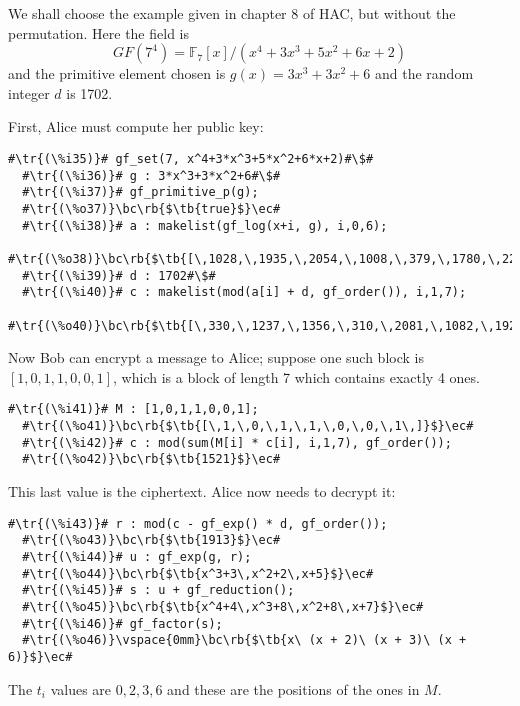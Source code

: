 \documentclass[a4paper,11pt,leqno,fleqn]{artikel3}
\newcommand{\bc}{\begin{center}}
\newcommand{\ec}{\end{center}}
\newcommand{\tr}[1]{\textcolor{red}{#1}}
\newcommand{\tb}[1]{\textcolor{blue}{#1}}
\newcommand{\rb}[1]{\raisebox{2mm}[0mm][1mm]{#1}}
\begin{document}
We shall choose the example given in chapter 8 of HAC, but without the
permutation.  Here the field is
\[
GF(7^4)=\mathbb{F}_7[x]/(x^4+3x^3+5x^2+6x+2)
\]
and the primitive element chosen is $g(x)=3x^3+3x^2+6$ and the random integer
$d$ is 1702.

First, Alice must compute her public key:


\vspace*{2mm}
\begin{lstlisting}[escapechar=\#]
  #\tr{(\%i35)}# gf_set(7, x^4+3*x^3+5*x^2+6*x+2)#\$#
  #\tr{(\%i36)}# g : 3*x^3+3*x^2+6#\$#
  #\tr{(\%i37)}# gf_primitive_p(g);
  #\tr{(\%o37)}\bc\rb{$\tb{true}$}\ec#
  #\tr{(\%i38)}# a : makelist(gf_log(x+i, g), i,0,6);
  #\tr{(\%o38)}\bc\rb{$\tb{[\,1028,\,1935,\,2054,\,1008,\,379,\,1780,\,223\,]}$}\ec#
  #\tr{(\%i39)}# d : 1702#\$#
  #\tr{(\%i40)}# c : makelist(mod(a[i] + d, gf_order()), i,1,7);
  #\tr{(\%o40)}\bc\rb{$\tb{[\,330,\,1237,\,1356,\,310,\,2081,\,1082,\,1925\,]}$}\ec#
\end{lstlisting}

Now Bob can encrypt a message to Alice; suppose one such block is
$[1,0,1,1,0,0,1]$, which is a block of length 7 which contains exactly 4 ones.

\vspace*{2mm}
\begin{lstlisting}[escapechar=\#]
  #\tr{(\%i41)}# M : [1,0,1,1,0,0,1];
  #\tr{(\%o41)}\bc\rb{$\tb{[\,1,\,0,\,1,\,1,\,0,\,0,\,1\,]}$}\ec#
  #\tr{(\%i42)}# c : mod(sum(M[i] * c[i], i,1,7), gf_order());
  #\tr{(\%o42)}\bc\rb{$\tb{1521}$}\ec#
\end{lstlisting}

This last value is the ciphertext.  Alice now needs to decrypt it:

\vspace*{2mm}
\begin{lstlisting}[escapechar=\#]
  #\tr{(\%i43)}# r : mod(c - gf_exp() * d, gf_order());
  #\tr{(\%o43)}\bc\rb{$\tb{1913}$}\ec#
  #\tr{(\%i44)}# u : gf_exp(g, r);
  #\tr{(\%o44)}\bc\rb{$\tb{x^3+3\,x^2+2\,x+5}$}\ec#
  #\tr{(\%i45)}# s : u + gf_reduction();
  #\tr{(\%o45)}\bc\rb{$\tb{x^4+4\,x^3+8\,x^2+8\,x+7}$}\ec#
  #\tr{(\%i46)}# gf_factor(s);
  #\tr{(\%o46)}\vspace{0mm}\bc\rb{$\tb{x\ (x + 2)\ (x + 3)\ (x + 6)}$}\ec#
\end{lstlisting}

The $t_i$ values are $0,2,3,6$ and these are the positions of the ones in $M$.
\end{document}
